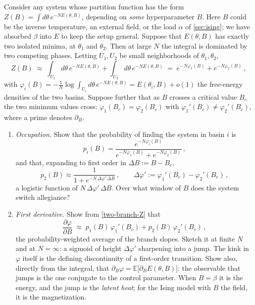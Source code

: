 \documentclass[11pt]{article}
\newcommand{\E}{\mathbb{E}}
\newcommand{\pd}{\partial}
\begin{document}
\begin{exercise}
\label{ex:anatomy}
\important
Consider any system whose partition function has the form $Z(B) = \int d\theta\, e^{-N E(\theta,B)}$, depending on \emph{some} hyperparameter $B$. Here $B$ could be the inverse temperature, an external field, or the load $\alpha$ of \cref{sec:ising}; we have absorbed $\beta$ into $E$ to keep the setup general. Suppose that $E(\theta,B)$ has exactly two isolated minima, at $\theta_1$ and $\theta_2$. Then at large $N$ the integral is dominated by two competing phases. Letting $U_1,U_2$ be small neighborhoods of $\theta_1,\theta_2$,
%
\begin{equation}
    Z(B) \;\approx\; \int_{U_1} d\theta\,e^{-N E(\theta,B)} + \int_{U_2} d\theta\,e^{-N E(\theta,B)} \;=\; e^{-N\varphi_1(B)} + e^{-N\varphi_2(B)}\,, \label{two-branch-Z}
\end{equation}
%
with $\varphi_i(B) = -\frac{1}{N}\log\int_{U_i}d\theta\,e^{-NE(\theta,B)} = E(\theta_i,B) + o(1)$ the free-energy densities of the two basins. Suppose further that as $B$ crosses a critical value $B_c$ the two minimum values cross: $\varphi_1(B_c) = \varphi_2(B_c)$ with $\varphi_1'(B_c)\neq\varphi_2'(B_c)$, where a prime denotes $\pd_B$.
\begin{enumerate}
    \item \emph{Occupation.} Show that the probability of finding the system in basin $i$ is
    \begin{equation}
        p_i(B) = \frac{e^{-N\varphi_i(B)}}{e^{-N\varphi_1(B)}+e^{-N\varphi_2(B)}}\,, \label{p-weights}
    \end{equation}
    and that, expanding to first order in $\Delta B := B - B_c$,
    \begin{equation}
        p_2(B) \approx \frac{1}{1+e^{-N\,\Delta\varphi'\,\Delta B}}\,,\qquad \Delta\varphi' := \varphi_1'(B_c) - \varphi_2'(B_c)\,, \label{p-logistic}
    \end{equation}
    a logistic function of $N\,\Delta\varphi'\,\Delta B$. Over what window of $B$ does the system switch allegiance?
    \item \emph{First derivative.} Show from \eqref{two-branch-Z} that
    \begin{equation} \label{dF-sigmoid}
        \frac{\pd\varphi}{\pd B} \;\approx\; p_1(B)\,\varphi_1'(B_c) + p_2(B)\,\varphi_2'(B_c)\,,
    \end{equation}
    the probability-weighted average of the branch slopes. Sketch it at finite $N$ and at $N=\infty$: a sigmoid of height $\Delta\varphi'$ sharpening into a jump. The kink in $\varphi$ itself is the defining discontinuity of a first-order transition. Show also, directly from the integral, that $\pd_B\varphi = \E\big[\pd_B E(\theta,B)\big]$: the observable that jumps is the one conjugate to the control parameter. When $B=\beta$ it is the energy, and the jump is the \emph{latent heat}; for the Ising model with $B$ the field, it is the magnetization.

\end{enumerate}
\end{exercise}
\end{document}
